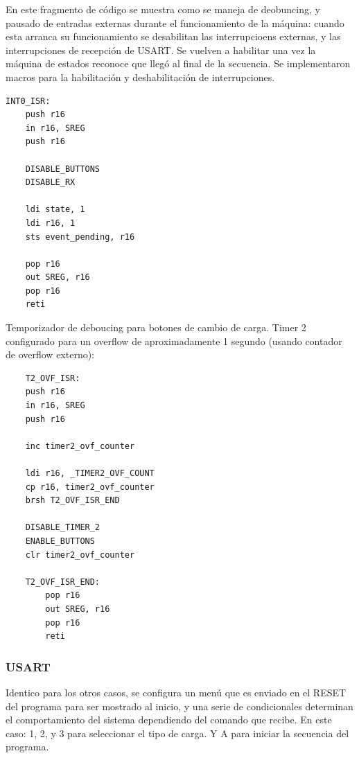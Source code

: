 En este fragmento de código se muestra como se maneja de deobuncing, y pausado de entradas externas durante el funcionamiento de la máquina: cuando esta arranca su funcionamiento se desabilitan las interrupcioens externas, y las interrupciones de recepción de USART. Se vuelven a habilitar una vez la máquina de estados reconoce que llegó al final de la secuencia. Se implementaron macros para la habilitación y deshabilitación de interrupciones.

\begin{verbatim}
INT0_ISR:
    push r16
    in r16, SREG
    push r16 

    DISABLE_BUTTONS
    DISABLE_RX

    ldi state, 1
    ldi r16, 1 
    sts event_pending, r16

    pop r16
    out SREG, r16
    pop r16 
    reti
\end{verbatim}

Temporizador de deboucing para botones de cambio de carga. Timer 2 configurado para un overflow de aproximadamente 1 segundo (usando contador de overflow externo):

\begin{verbatim}
    T2_OVF_ISR:
	push r16 
    in r16, SREG 
	push r16 
	
	inc timer2_ovf_counter
	
	ldi r16, _TIMER2_OVF_COUNT 
    cp r16, timer2_ovf_counter 
    brsh T2_OVF_ISR_END 
    
	DISABLE_TIMER_2
	ENABLE_BUTTONS
	clr timer2_ovf_counter
    
    T2_OVF_ISR_END:
		pop r16
		out SREG, r16
		pop r16	
		reti

\end{verbatim}


\subsubsection{USART}
Identico para los otros casos, se configura un menú que es enviado en el RESET del programa para ser mostrado al inicio, y una serie de condicionales determinan el comportamiento del sistema dependiendo del comando que recibe. En este caso: 1, 2, y 3 para seleccionar el tipo de carga. Y A para iniciar la secuencia del programa.


